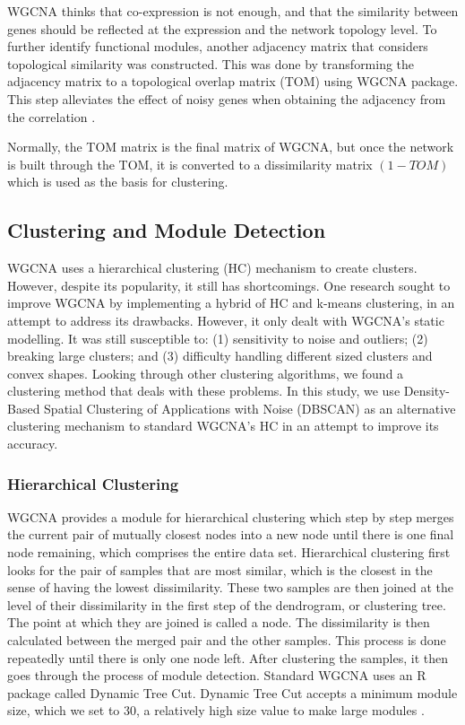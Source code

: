 \documentclass[sigconf,authordraft]{acmart}
\begin{document}
    
WGCNA thinks that co-expression is not enough, and that the similarity between genes should be reflected at the expression and the network topology level. To further identify functional modules, another adjacency matrix that considers topological similarity was constructed. This was done by transforming the adjacency matrix to a topological overlap matrix (TOM) using WGCNA package. This step alleviates the effect of noisy genes when obtaining the adjacency from the correlation \cite{YipHorvath2007}. 

Normally, the TOM matrix is the final matrix of WGCNA, but once the network is built through the TOM, it is converted to a dissimilarity matrix $(1-TOM)$ which is used as the basis for clustering. 

\subsection{Clustering and Module Detection}
WGCNA uses a hierarchical clustering (HC) mechanism to create clusters. However, despite its popularity, it still has shortcomings. One research sought to improve WGCNA by implementing a hybrid of HC and k-means clustering, in an attempt to address its drawbacks. However, it only dealt with WGCNA's static modelling. It was still susceptible to: (1) sensitivity to noise and outliers; (2) breaking large clusters; and (3) difficulty handling different sized clusters and convex shapes. Looking through other clustering algorithms, we found a clustering method that deals with these problems. In this study, we use Density-Based Spatial Clustering of Applications with Noise (DBSCAN) as an alternative clustering mechanism to standard WGCNA's HC in an attempt to improve its accuracy.

\subsubsection{Hierarchical Clustering}
WGCNA provides a module for hierarchical clustering which step by step merges the current pair of mutually closest nodes into a new node until there is one final node remaining, which comprises the entire data set. Hierarchical clustering first looks for the pair of samples that are most similar, which is the closest in the sense of having the lowest dissimilarity. These two samples are then joined at the level of their dissimilarity in the first step of the dendrogram, or clustering tree. The point at which they are joined is called a node. The dissimilarity is then calculated between the merged pair and the other samples. This process is done repeatedly until there is only one node left. 
After clustering the samples, it then goes through the process of module detection. Standard WGCNA uses an R package called Dynamic Tree Cut. Dynamic Tree Cut accepts a minimum module size, which we set to 30, a relatively high size value to make large modules \cite{Greenacre2008}.
\end{document}
